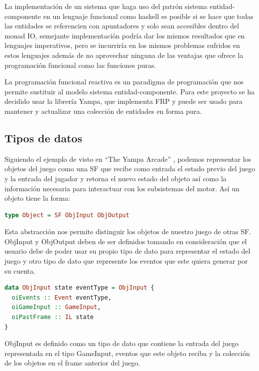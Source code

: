 La implementación de un sistema que haga uso del patrón sistema entidad-componente en un lenguaje funcional como haskell es posible si se hace que todas las entidades se referencien con apuntadores y solo sean accesibles dentro del monad IO, semejante implementación podría dar los mismos resultados que en lenguajes imperativos, pero se incurriría en los mismos problemas sufridos en estos lenguajes además de no aprovechar ninguna de las ventajas que ofrece la programación funcional como las funciones puras.

La programación funcional reactiva es un paradigma de programación que nos permite sustituir al modelo sistema entidad-componente. Para este proyecto se ha decidido usar la librería Yampa, que implementa FRP y puede ser usado para mantener y actualizar una colección de entidades en forma pura.

\subsection{Tipos de datos}

Siguiendo el ejemplo de visto en “The Yampa Arcade” \cite{Courtney2003b}, podemos representar los objetos del juego como una SF que recibe como entrada el estado previo del juego y la entrada del jugador y retorna el nuevo estado del objeto así como la información necesaria para interactuar con los subsistemas del motor. Así un objeto tiene la forma:

\begin{lstlisting}[label={ObjDef1},frame=single,language=Haskell]
type Object = SF ObjInput ObjOutput
\end{lstlisting}

Esta abstracción nos permite distinguir los objetos de nuestro juego de otras SF. ObjInput y ObjOutput deben de ser definidos tomando en consideración que el usuario debe de poder usar su propio tipo de dato para representar el estado del juego y otro tipo de dato que represente los eventos que este quiera generar por su cuenta.

\begin{lstlisting}[label={ObjInputDef},frame=single,language=Haskell]
data ObjInput state eventType = ObjInput {
  oiEvents :: Event eventType,
  oiGameInput :: GameInput,
  oiPastFrame :: IL state
}
\end{lstlisting}

ObjInput es definido como un tipo de dato que contiene la entrada del juego representada en el tipo GameInput, eventos que este objeto reciba y la colección de los objetos en el frame anterior del juego.

